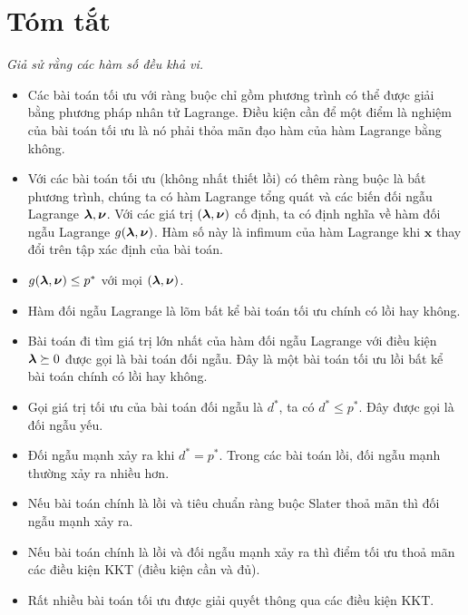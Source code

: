\section{Tóm tắt}
\textit{Giả sử rằng các hàm số đều khả vi.}
\begin{itemize}
\item Các bài toán tối ưu với ràng buộc chỉ gồm phương trình có thể được giải
bằng phương pháp nhân tử Lagrange. Điều kiện cần để một điểm là nghiệm của bài toán tối ưu là nó
phải thỏa mãn đạo hàm của hàm Lagrange bằng không.

\item Với các bài toán tối ưu (không nhất thiết lồi) có thêm ràng buộc là bất phương trình, chúng ta có hàm Lagrange tổng quát và các biến đối ngẫu Lagrange
$\boldsymbol{\lambda}, \boldsymbol{\nu}$. Với các giá trị $(\boldsymbol{\lambda}, \boldsymbol{\nu})$ cố định, ta có định
nghĩa về hàm đối ngẫu Lagrange
$g(\boldsymbol{\lambda}, \boldsymbol{\nu})$. Hàm số này là infimum của hàm Lagrange khi
$\mathbf{x}$ thay đổi trên tập xác định của bài toán.


\item $g(\boldsymbol{\lambda}, \boldsymbol{\nu}) \leq p^*$ với mọi $(\boldsymbol{\lambda}, \boldsymbol{\nu})$.

\item Hàm đối ngẫu Lagrange là lõm bất kể bài toán tối ưu chính có lồi hay không.

\item Bài toán đi tìm giá trị lớn nhất của hàm đối ngẫu Lagrange với điều
kiện $\boldsymbol{\lambda} \succeq 0$ được gọi là {bài toán đối ngẫu}. Đây là một bài toán tối ưu lồi bất kể bài toán chính có lồi hay không.

\item Gọi giá trị tối ưu của bài toán đối ngẫu là $d^*$, ta có $d^*
\leq p^*$. Đây được gọi là đối ngẫu yếu.

\item Đối ngẫu mạnh xảy ra khi $d^* = p^*$. Trong các bài toán lồi, đối ngẫu mạnh thường xảy ra nhiều hơn.

\item Nếu bài toán chính là lồi và tiêu chuẩn ràng buộc Slater thoả mãn thì đối ngẫu mạnh xảy ra.

\item Nếu bài toán chính là lồi và đối ngẫu mạnh xảy ra thì điểm tối ưu thoả mãn các điều kiện KKT (điều kiện cần và đủ).

\item Rất nhiều bài toán tối ưu được giải quyết thông qua các điều kiện KKT.

\end{itemize}

